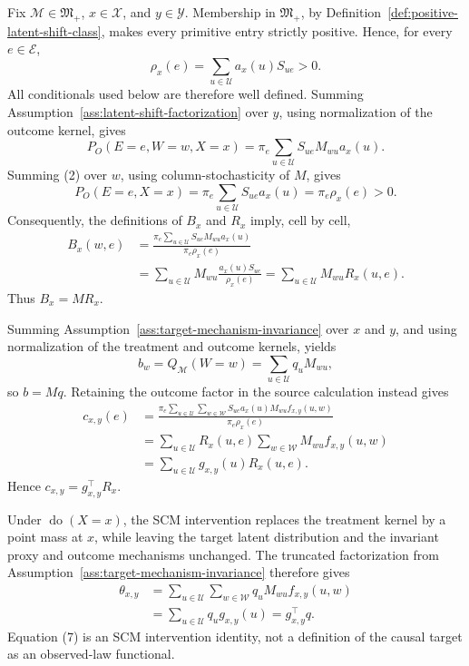 Fix \(\mathcal M\in\mathfrak M_{+}\), \(x\in\mathcal X\), and \(y\in\mathcal Y\).  Membership in \(\mathfrak M_{+}\), by Definition~\ref{def:positive-latent-shift-class}, makes every primitive entry strictly positive.  Hence, for every \(e\in\mathcal E\),
\[
\rho_x(e)=\sum_{u\in\mathcal U}a_x(u)S_{ue}>0.
\tag{1}
\]
All conditionals used below are therefore well defined.  Summing Assumption~\ref{ass:latent-shift-factorization} over \(y\), using normalization of the outcome kernel, gives
\[
P_O(E=e,W=w,X=x)
=\pi_e\sum_{u\in\mathcal U}S_{ue}M_{wu}a_x(u).
\tag{2}
\]
Summing (2) over \(w\), using column-stochasticity of \(M\), gives
\[
P_O(E=e,X=x)=\pi_e\sum_{u\in\mathcal U}S_{ue}a_x(u)
=\pi_e\rho_x(e)>0.
\tag{3}
\]
Consequently, the definitions of \(B_x\) and \(R_x\) imply, cell by cell,
\[
\begin{aligned}
B_x(w,e)
&=\frac{\pi_e\sum_{u\in\mathcal U}S_{ue}M_{wu}a_x(u)}
        {\pi_e\rho_x(e)}\\
&=\sum_{u\in\mathcal U}M_{wu}
  \frac{a_x(u)S_{ue}}{\rho_x(e)}
=\sum_{u\in\mathcal U}M_{wu}R_x(u,e).
\end{aligned}
\tag{4}
\]
Thus \(B_x=MR_x\).

Summing Assumption~\ref{ass:target-mechanism-invariance} over \(x\) and \(y\), and using normalization of the treatment and outcome kernels, yields
\[
b_w=Q_{\mathcal M}(W=w)
=\sum_{u\in\mathcal U}q_uM_{wu},
\tag{5}
\]
so \(b=Mq\).  Retaining the outcome factor in the source calculation instead gives
\[
\begin{aligned}
c_{x,y}(e)
&=\frac{\pi_e\sum_{u\in\mathcal U}\sum_{w\in\mathcal W}
 S_{ue}a_x(u)M_{wu}f_{x,y}(u,w)}
 {\pi_e\rho_x(e)}\\
&=\sum_{u\in\mathcal U}R_x(u,e)
  \sum_{w\in\mathcal W}M_{wu}f_{x,y}(u,w)\\
&=\sum_{u\in\mathcal U}g_{x,y}(u)R_x(u,e).
\end{aligned}
\tag{6}
\]
Hence \(c_{x,y}=g_{x,y}^{\top}R_x\).

Under \(\operatorname{do}(X=x)\), the SCM intervention replaces the treatment kernel by a point mass at \(x\), while leaving the target latent distribution and the invariant proxy and outcome mechanisms unchanged.  The truncated factorization from Assumption~\ref{ass:target-mechanism-invariance} therefore gives
\[
\begin{aligned}
\theta_{x,y}
&=\sum_{u\in\mathcal U}\sum_{w\in\mathcal W}
  q_uM_{wu}f_{x,y}(u,w)\\
&=\sum_{u\in\mathcal U}q_ug_{x,y}(u)
=g_{x,y}^{\top}q.
\end{aligned}
\tag{7}
\]
Equation (7) is an SCM intervention identity, not a definition of the causal target as an observed-law functional.

